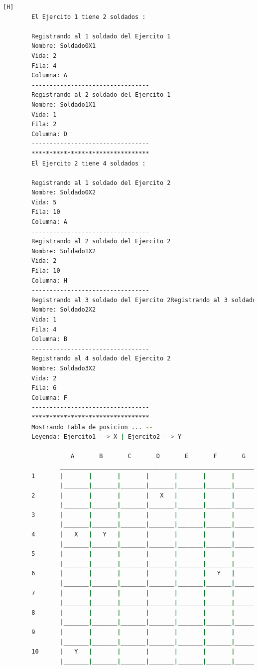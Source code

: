 \documentclass{article}
\begin{document}
	\begin{lstlisting}[language=bash,caption={La ejecución: \textcolor{red}{PARA PODER VER LA TABLA COMPLETAMENTE MIRAR LA PLANTILLA DE LATEX O EJECUTARLO: }}][H]
		El Ejercito 1 tiene 2 soldados : 

		Registrando al 1 soldado del Ejercito 1
		Nombre: Soldado0X1
		Vida: 2
		Fila: 4
		Columna: A
		---------------------------------
		Registrando al 2 soldado del Ejercito 1
		Nombre: Soldado1X1
		Vida: 1
		Fila: 2
		Columna: D
		---------------------------------
		*********************************
		El Ejercito 2 tiene 4 soldados : 
		
		Registrando al 1 soldado del Ejercito 2
		Nombre: Soldado0X2
		Vida: 5
		Fila: 10
		Columna: A
		---------------------------------
		Registrando al 2 soldado del Ejercito 2
		Nombre: Soldado1X2
		Vida: 2
		Fila: 10
		Columna: H
		---------------------------------
		Registrando al 3 soldado del Ejercito 2Registrando al 3 soldado del Ejercito 2
		Nombre: Soldado2X2
		Vida: 1
		Fila: 4
		Columna: B
		---------------------------------
		Registrando al 4 soldado del Ejercito 2
		Nombre: Soldado3X2
		Vida: 2
		Fila: 6
		Columna: F
		---------------------------------
		*********************************
		Mostrando tabla de posicion ... --
		Leyenda: Ejercito1 --> X | Ejercito2 --> Y
		
				   A       B       C       D       E       F       G       H       I       J
				_________________________________________________________________________________
		1       |       |       |       |       |       |       |       |       |       |       |
				|_______|_______|_______|_______|_______|_______|_______|_______|_______|_______|
		2       |       |       |       |   X   |       |       |       |       |       |       |
				|_______|_______|_______|_______|_______|_______|_______|_______|_______|_______|
		3       |       |       |       |       |       |       |       |       |       |       |
				|_______|_______|_______|_______|_______|_______|_______|_______|_______|_______|
		4       |   X   |   Y   |       |       |       |       |       |       |       |       |
				|_______|_______|_______|_______|_______|_______|_______|_______|_______|_______|
		5       |       |       |       |       |       |       |       |       |       |       |
				|_______|_______|_______|_______|_______|_______|_______|_______|_______|_______|
		6       |       |       |       |       |       |   Y   |       |       |       |       |
				|_______|_______|_______|_______|_______|_______|_______|_______|_______|_______|
		7       |       |       |       |       |       |       |       |       |       |       |
				|_______|_______|_______|_______|_______|_______|_______|_______|_______|_______|
		8       |       |       |       |       |       |       |       |       |       |       |
				|_______|_______|_______|_______|_______|_______|_______|_______|_______|_______|
		9       |       |       |       |       |       |       |       |       |       |       |
				|_______|_______|_______|_______|_______|_______|_______|_______|_______|_______|
		10      |   Y   |       |       |       |       |       |       |   Y   |       |       |
				|_______|_______|_______|_______|_______|_______|_______|_______|_______|_______|
		

\end{lstlisting}
\end{document}
